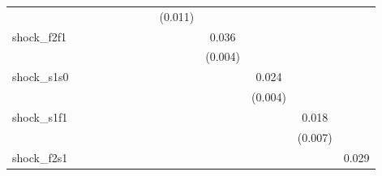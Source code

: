 {\begin{tabular}{l*{12}{c}}
            &                     &                     &                     &                     &                     &                     &                     &     (0.011)         &                     &                     &                     &                     \\
\addlinespace
shock\_f2f1  &                     &                     &                     &                     &                     &                     &                     &                     &       0.036\sym{***}&                     &                     &                     \\
            &                     &                     &                     &                     &                     &                     &                     &                     &     (0.004)         &                     &                     &                     \\
\addlinespace
shock\_s1s0  &                     &                     &                     &                     &                     &                     &                     &                     &                     &       0.024\sym{***}&                     &                     \\
            &                     &                     &                     &                     &                     &                     &                     &                     &                     &     (0.004)         &                     &                     \\
\addlinespace
shock\_s1f1  &                     &                     &                     &                     &                     &                     &                     &                     &                     &                     &       0.018\sym{**} &                     \\
            &                     &                     &                     &                     &                     &                     &                     &                     &                     &                     &     (0.007)         &                     \\
\addlinespace
shock\_f2s1  &                     &                     &                     &                     &                     &                     &                     &                     &                     &                     &                     &       0.029\sym{***}\\

\end{tabular}}
